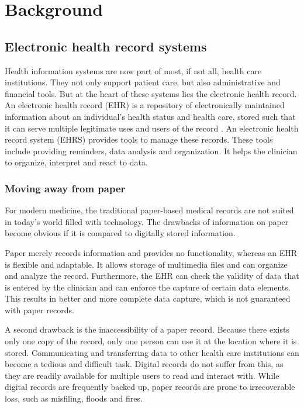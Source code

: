 \section{Background}



    \subsection{Electronic health record systems}

    Health information systems are now part of most, if not all, health care institutions. They not only support patient care, but also administrative and financial tools. But at the heart of these systems lies the electronic health record. An electronic health record (EHR) is a repository of electronically maintained information about an individual's health status and health care, stored such that it can serve multiple legitimate uses and users of the record \cite{biomedical_informatics}. An electronic health record system (EHRS) provides tools to manage these records. These tools include providing reminders, data analysis and organization. It helps the clinician to organize, interpret and react to data.

        \subsubsection{Moving away from paper} \label{2_ehrs_paper}

        For modern medicine, the traditional paper-based medical records are not suited in today's world filled with technology. The drawbacks of information on paper become obvious if it is compared to digitally stored information.

        Paper merely records information and provides no functionality, whereas an EHR is flexible and adaptable. It allows storage of multimedia files and can organize and analyze the record. Furthermore, the EHR can check the validity of data that is entered by the clinician and can enforce the capture of certain data elements. This results in better and more complete data capture, which is not guaranteed with paper records.

        A second drawback is the inaccessibility of a paper record. Because there exists only one copy of the record, only one person can use it at the location where it is stored. Communicating and transferring data to other health care institutions can become a tedious and difficult task. Digital records do not suffer from this, as they are readily available for multiple users to read and interact with. While digital records are frequently backed up, paper records are prone to irrecoverable loss, such as misfiling, floods and fires.

